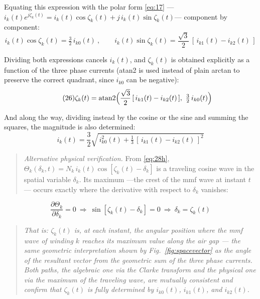\documentclass[11pt,a4paper]{article}
\begin{document}
Equating this expression with the polar form \eqref{eq:17} ---$i_k(t)e^{j\zeta_k(t)} = i_k(t)\cos\zeta_k(t)\allowbreak{} + j\,i_k(t)\sin\zeta_k(t)$--- component by component:
\begin{equation}\tag{25}\label{eq:25}
i_k(t)\cos\zeta_k(t) = \tfrac32\, i_{k0}(t)\ ,\qquad i_k(t)\sin\zeta_k(t) = \frac{\sqrt3}{2}\,[\,i_{k1}(t) - i_{k2}(t)\,]
\end{equation}

Dividing both expressions cancels $i_k(t)$, and $\zeta_k(t)$ is obtained explicitly as a function of the three phase currents (atan2 is used instead of plain arctan to preserve the correct quadrant, since $i_{k0}$ can be negative):
\begin{equation}\tag{26}\label{eq:26}
\zeta_k(t) = \operatorname{atan2}\Bigl(\frac{\sqrt3}{2}\,[\,i_{k1}(t) - i_{k2}(t)\,],\ \tfrac32\, i_{k0}(t)\Bigr)
\end{equation}

And along the way, dividing instead by the cosine or the sine and summing the squares, the magnitude is also determined:
\begin{equation}\tag{27}\label{eq:27}
i_k(t) = \frac32\sqrt{\,i_{k0}^{2}(t) + \tfrac13\,[\,i_{k1}(t) - i_{k2}(t)\,]^{2}}
\end{equation}

\begin{quote}\emph{Alternative physical verification.} From \eqref{eq:28h}, $\Theta_k(\delta_k,t)=N_k\,i_k(t)\cos[\zeta_k(t)-\delta_k]$ is a traveling cosine wave in the spatial variable $\delta_k$. Its maximum ---the crest of the mmf wave at instant $t$--- occurs exactly where the derivative with respect to $\delta_k$ vanishes:\end{quote}
\begin{equation}\tag{28}\label{eq:28}
\frac{\partial\Theta_k}{\partial\delta_k} = 0\ \Rightarrow\ \sin[\zeta_k(t)-\delta_k] = 0\ \Rightarrow\ \delta_k = \zeta_k(t)
\end{equation}

\begin{quote}\emph{That is: $\zeta_k(t)$ is, at each instant, the angular position where the mmf wave of winding $k$ reaches its maximum value along the air gap --- the same geometric interpretation shown by Fig.~\ref{fig:spacevector} as the angle of the resultant vector from the geometric sum of the three phase currents. Both paths, the algebraic one via the Clarke transform and the physical one via the maximum of the traveling wave, are mutually consistent and confirm that $\zeta_k(t)$ is fully determined by $i_{k0}(t)$, $i_{k1}(t)$, and $i_{k2}(t)$.}\end{quote}
\end{document}
